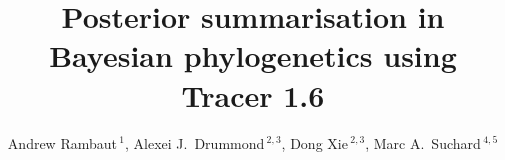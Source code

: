 \documentclass{bioinfo}
\begin{document}

\title[Tracer 1.6]{Posterior summarisation in Bayesian phylogenetics using Tracer 1.6}

\author[Rambaut \textit{et~al}]{ Andrew Rambaut\,$^{1}$, Alexei J.~Drummond\,$^{2,3}$, Dong Xie\,$^{2,3}$, Marc A.~Suchard\,$^{4,5}$}

\address{
$^{1}$Institute of Evolutionary Biology, University of Edinburgh, Edinburgh, UK\\
$^{2}$Department of Computer Science, University of Auckland, Auckland, NZ\\
$^{3}$Centre for Computational Evolution, University of Auckland, Auckland, NZ\\
$^{4}$Departments of Biomathematics and Human Genetics, David Geffen School of Medicine, UCLA, and \\
$^{5}$Department of Biostatistics, UCLA Fielding School of Public Health, University of California, Los Angeles, USA \\
}



\maketitle
\end{document}
